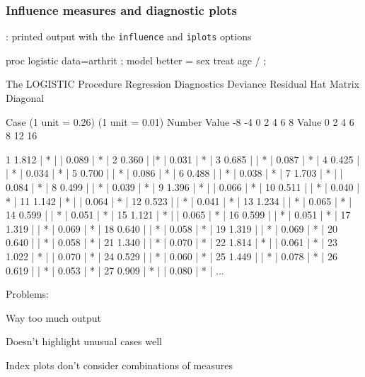 \begin{frame}
  \frametitle{Influence measures and diagnostic plots}
: printed output with the \texttt{influence} and \texttt{iplots} options
\begin{Input}
proc logistic data=arthrit ;
   model better = sex treat age / ;
\end{Input}

\begin{Output}[fontsize=\footnotesize,baselinestretch=0.6]
                     The LOGISTIC Procedure
                     Regression Diagnostics
          Deviance Residual               Hat Matrix Diagonal

Case             (1 unit = 0.26)               (1 unit = 0.01)
Number  Value   -8  -4  0 2 4 6 8     Value   0 2 4 6 8  12  16

   1    1.812  | *      |        |    0.089  |          *      |
   2    0.360  |        |*       |    0.031  |    *            |
   3    0.685  |        |  *     |    0.087  |          *      |
   4    0.425  |        | *      |    0.034  |    *            |
   5    0.700  |        |  *     |    0.086  |          *      |
   6    0.488  |        | *      |    0.038  |    *            |
   7    1.703  |  *     |        |    0.084  |         *       |
   8    0.499  |        | *      |    0.039  |    *            |
   9    1.396  |   *    |        |    0.066  |        *        |
  10    0.511  |        | *      |    0.040  |     *           |
  11    1.142  |    *   |        |    0.064  |       *         |
  12    0.523  |        | *      |    0.041  |     *           |
  13    1.234  |        |    *   |    0.065  |       *         |
  14    0.599  |        | *      |    0.051  |      *          |
  15    1.121  |    *   |        |    0.065  |       *         |
  16    0.599  |        | *      |    0.051  |      *          |
  17    1.319  |        |    *   |    0.069  |        *        |
  18    0.640  |        | *      |    0.058  |       *         |
  19    1.319  |        |    *   |    0.069  |        *        |
  20    0.640  |        | *      |    0.058  |       *         |
  21    1.340  |        |    *   |    0.070  |        *        |
  22    1.814  | *      |        |    0.061  |       *         |
  23    1.022  |    *   |        |    0.070  |        *        |
  24    0.529  |        | *      |    0.060  |       *         |
  25    1.449  |        |    *   |    0.078  |         *       |
  26    0.619  |        | *      |    0.053  |      *          |
  27    0.909  |     *  |        |    0.080  |         *       |
  ...
\end{Output}
Problems:
\begin{itemize*}
\item Way too much output
\item Doesn't highlight unusual cases well
\item Index plots don't consider combinations of measures
\end{itemize*}

\end{frame}


